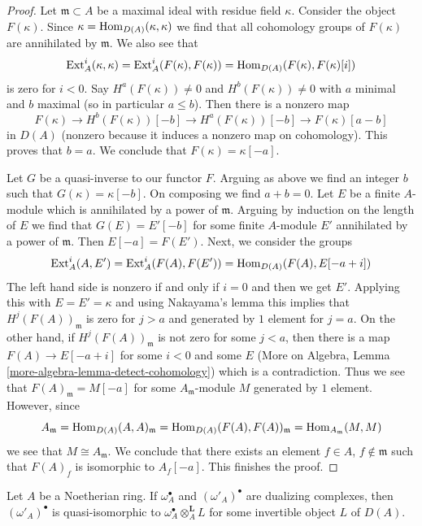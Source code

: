 \begin{proof}
Let $\mathfrak m \subset A$ be a maximal ideal with residue field $\kappa$.
Consider the object $F(\kappa)$. Since
$\kappa = \mathop{\mathrm{Hom}}\nolimits_{D(A)}(\kappa, \kappa)$ we find that all
cohomology groups of $F(\kappa)$ are annihilated by $\mathfrak m$.
We also see that
$$
\mathop{\mathrm{Ext}}\nolimits^i_A(\kappa, \kappa) = \text{Ext}^i_A(F(\kappa), F(\kappa))
= \mathop{\mathrm{Hom}}\nolimits_{D(A)}(F(\kappa), F(\kappa)[i])
$$
is zero for $i < 0$. Say $H^a(F(\kappa)) \not = 0$ and
$H^b(F(\kappa)) \not = 0$ with $a$ minimal and $b$ maximal
(so in particular $a \leq b$). Then there is a nonzero map
$$
F(\kappa) \to H^b(F(\kappa))[-b] \to H^a(F(\kappa))[-b]
\to F(\kappa)[a - b]
$$
in $D(A)$ (nonzero because it induces a nonzero map on cohomology).
This proves that $b = a$. We conclude that $F(\kappa) = \kappa[-a]$.

\medskip\noindent
Let $G$ be a quasi-inverse to our functor $F$. Arguing as above
we find an integer $b$ such that $G(\kappa) = \kappa[-b]$.
On composing we find $a + b = 0$. Let $E$ be a finite $A$-module
which is annihilated by a power of $\mathfrak m$. Arguing by
induction on the length of $E$ we find that $G(E) = E'[-b]$
for some finite $A$-module $E'$ annihilated by a power of
$\mathfrak m$. Then $E[-a] = F(E')$.
Next, we consider the groups
$$
\mathop{\mathrm{Ext}}\nolimits^i_A(A, E') = \text{Ext}^i_A(F(A), F(E')) =
\mathop{\mathrm{Hom}}\nolimits_{D(A)}(F(A), E[-a + i])
$$
The left hand side is nonzero if and only if $i = 0$ and then
we get $E'$. Applying this with $E = E' = \kappa$ and using Nakayama's
lemma this implies that $H^j(F(A))_\mathfrak m$ is zero for $j > a$ and
generated by $1$ element for $j = a$. On the other hand, if
$H^j(F(A))_\mathfrak m$ is not zero for some $j < a$, then
there is a map $F(A) \to E[-a + i]$ for some $i < 0$ and some
$E$ (More on Algebra, Lemma \ref{more-algebra-lemma-detect-cohomology})
which is a contradiction.
Thus we see that $F(A)_\mathfrak m = M[-a]$
for some $A_\mathfrak m$-module $M$ generated by $1$ element.
However, since
$$
A_\mathfrak m = \mathop{\mathrm{Hom}}\nolimits_{D(A)}(A, A)_\mathfrak m =
\mathop{\mathrm{Hom}}\nolimits_{D(A)}(F(A), F(A))_\mathfrak m = \mathop{\mathrm{Hom}}\nolimits_{A_\mathfrak m}(M, M)
$$
we see that $M \cong A_\mathfrak m$. We conclude that there exists
an element $f \in A$, $f \not \in \mathfrak m$ such that
$F(A)_f$ is isomorphic to $A_f[-a]$. This finishes the proof.
\end{proof}

\begin{lemma}
\label{lemma-dualizing-unique}
Let $A$ be a Noetherian ring. If $\omega_A^\bullet$ and
$(\omega'_A)^\bullet$ are dualizing complexes, then
$(\omega'_A)^\bullet$ is quasi-isomorphic to
$\omega_A^\bullet \otimes_A^\mathbf{L} L$
for some invertible object $L$ of $D(A)$.
\end{lemma}

